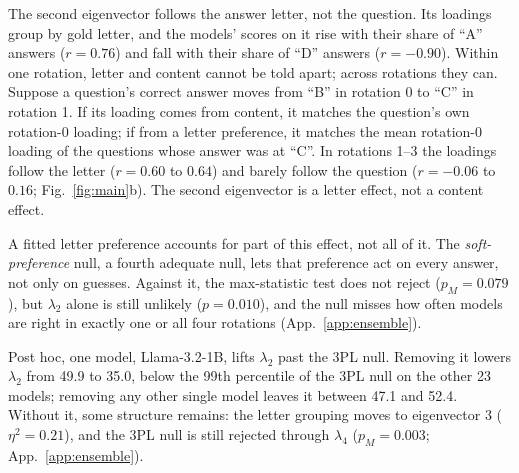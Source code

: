 \documentclass{article}
\theoremstyle{plain}
\theoremstyle{remark}
\begin{document}
The second eigenvector follows the answer letter, not the question. Its
loadings group by gold letter, and the models' scores on it rise with
their share of ``A'' answers ($r=0.76$) and fall with their share of
``D'' answers ($r=-0.90$). Within one rotation, letter and content
cannot be told apart; across rotations they can. Suppose a question's correct answer moves from ``B''
in rotation 0 to ``C'' in rotation 1. If its loading comes from content,
it matches the question's own rotation-0 loading; if from a letter
preference, it matches the mean rotation-0 loading of the questions whose answer was at ``C''. In rotations 1--3 the
loadings follow the letter ($r=0.60$ to $0.64$) and barely follow the
question ($r=-0.06$ to $0.16$; Fig.~\ref{fig:main}b). The second eigenvector is a
letter effect, not a content effect.

A fitted letter preference accounts for part of this effect, not all of
it. The \emph{soft-preference} null, a fourth adequate null, lets
that preference act on every answer, not only on guesses. Against it,
the max-statistic test does not reject ($p_M=0.079$), but $\lambda_2$
alone is still unlikely ($p=0.010$), and the null misses how often
models are right in exactly one or all four rotations
(App.~\ref{app:ensemble}).

Post hoc, one model, Llama-3.2-1B, lifts $\lambda_2$ past the 3PL
null. Removing it
lowers $\lambda_2$ from 49.9 to 35.0, below the 99th percentile of the
3PL null on the other 23 models; removing any other single model leaves
it between 47.1 and 52.4. Without it, some structure remains: the
letter grouping moves to eigenvector 3 ($\eta^2=0.21$), and the
3PL null is still rejected through $\lambda_4$ ($p_M=0.003$; App.~\ref{app:ensemble}).
\end{document}
